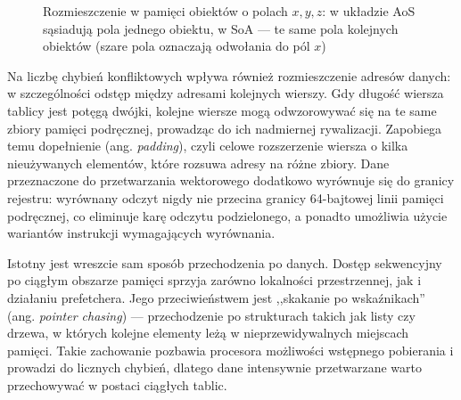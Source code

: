 \documentclass[a4paper,12pt]{book} %
\begin{document}
\begin{figure}[t!]
\centering
{}
\caption{Rozmieszczenie w pamięci obiektów o polach $x, y, z$: w układzie AoS sąsiadują pola jednego obiektu, w SoA --- te same pola kolejnych obiektów (szare pola oznaczają odwołania do pól $x$)}
\label{rys:aossoa}
\end{figure}

Na liczbę chybień konfliktowych wpływa również rozmieszczenie adresów danych: w szczególności odstęp między adresami kolejnych wierszy. Gdy długość wiersza tablicy jest potęgą dwójki, kolejne wiersze mogą odwzorowywać się na te same zbiory pamięci podręcznej, prowadząc do ich nadmiernej rywalizacji. Zapobiega temu dopełnienie (ang. \emph{padding}), czyli celowe rozszerzenie wiersza o kilka nieużywanych elementów, które rozsuwa adresy na różne zbiory. Dane przeznaczone do przetwarzania wektorowego dodatkowo wyrównuje się do granicy rejestru: wyrównany odczyt nigdy nie przecina granicy 64-bajtowej linii pamięci podręcznej, co eliminuje karę odczytu podzielonego, a ponadto umożliwia użycie wariantów instrukcji wymagających wyrównania.

Istotny jest wreszcie sam sposób przechodzenia po danych. Dostęp sekwencyjny po ciągłym obszarze pamięci sprzyja zarówno lokalności przestrzennej, jak i działaniu prefetchera. Jego przeciwieństwem jest ,,skakanie po wskaźnikach'' (ang. \emph{pointer chasing}) --- przechodzenie po strukturach takich jak listy czy drzewa, w których kolejne elementy leżą w nieprzewidywalnych miejscach pamięci. Takie zachowanie pozbawia procesora możliwości wstępnego pobierania i prowadzi do licznych chybień, dlatego dane intensywnie przetwarzane warto przechowywać w postaci ciągłych tablic.
\end{document}
